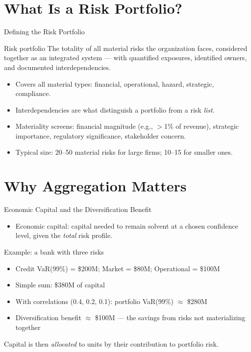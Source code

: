 \documentclass[11pt, aspectratio=169]{beamer}
\begin{document}
\section{What Is a Risk Portfolio?}

\begin{frame}{Defining the Risk Portfolio}
\begin{block}{Risk portfolio}
The totality of all \alert{material} risks the organization faces, considered together as an integrated system --- with quantified exposures, identified owners, and documented interdependencies.
\end{block}
\medskip
\begin{itemize}
  \item Covers all material types: financial, operational, hazard, strategic, compliance.
  \item Interdependencies are what distinguish a portfolio from a risk \emph{list}.
  \item Materiality screens: financial magnitude (e.g., $>$1\% of revenue), strategic importance, regulatory significance, stakeholder concern.
  \item Typical size: 20--50 material risks for large firms; 10--15 for smaller ones.
\end{itemize}
\end{frame}

\section{Why Aggregation Matters}

\begin{frame}{Economic Capital and the Diversification Benefit}
\begin{itemize}
  \item \alert{Economic capital}: capital needed to remain solvent at a chosen confidence level, given the \emph{total} risk profile.
\end{itemize}
\begin{exampleblock}{Example: a bank with three risks}
\begin{itemize}
  \item Credit VaR(99\%) = \$200M; Market = \$80M; Operational = \$100M
  \item Simple sum: \$380M of capital
  \item With correlations (0.4, 0.2, 0.1): portfolio VaR(99\%) $\approx$ \$280M
  \item \alert{Diversification benefit $\approx$ \$100M} --- the savings from risks not materializing together
\end{itemize}
\end{exampleblock}
\medskip
Capital is then \emph{allocated} to units by their contribution to portfolio risk.
\end{frame}
\end{document}
